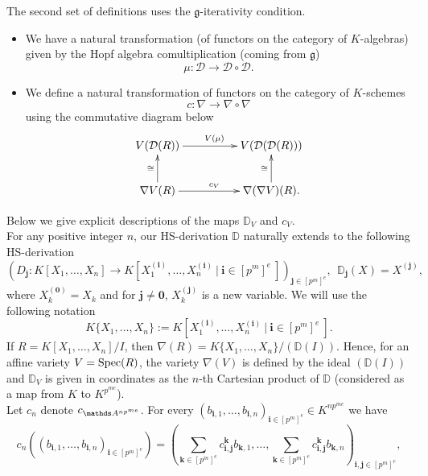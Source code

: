 \documentclass[10pt]{amsart}
\theoremstyle{definition}
\begin{document}
\noindent
The second set of definitions uses the $\mathfrak{g}$-iterativity condition.
\begin{itemize}

\item We have a natural transformation (of functors on the category of $K$-algebras) given by the Hopf algebra comultiplication (coming from $\mathfrak{g}$)
$$\mu:\mathcal{D}\to \mathcal{D}\circ \mathcal{D}.$$

\item We define a natural transformation of functors on the category of $K$-schemes
$$c:\nabla\to \nabla\circ \nabla$$
using the commutative diagram below
\begin{equation*}
\xymatrixcolsep{4pc}
\xymatrix{V(\mathcal{D}(R))  \ar[r]^{V(\mu)} &  V(\mathcal{D}(\mathcal{D}(R)))\\
  \nabla V(R) \ar[u]^{\cong} \ar[r]^{c_V} &  \nabla(\nabla V)(R) \ar[u]^{\cong}. }
\end{equation*}

\end{itemize}
\noindent
Below we give explicit descriptions of the maps $\mathbb{D}_V$ and $c_V$.
\\
For any positive integer $n$, our HS-derivation $\mathbb{D}$ naturally extends to the following HS-derivation
$$\left(D_{\mathbf{j}}:K[X_1,\ldots,X_n]\to K[X_1^{(\mathbf{i})},\ldots,X_n^{(\mathbf{i})}\ |\ \mathbf{i}\in[p^m]^e\ ]\right)_{\mathbf{j}\in[p^m]^e},\ \ \mathbb{D}_{\mathbf{j}}(X)=X^{(\mathbf{j})},$$
where $X_k^{(\mathbf{0})}=X_k$ and for $\mathbf{j}\neq \mathbf{0}$, $X_k^{(\mathbf{j})}$ is a new variable. We will use the following notation $$K\{X_1,\ldots,X_n\}:=K[X_1^{(\mathbf{i})},\ldots,X_n^{(\mathbf{i})}\ |\ \mathbf{i}\in[p^m]^e\ ].$$
If $R=K[X_1,\ldots,X_n]/I$, then $\nabla(R)=K\{X_1,\ldots,X_n\}/(\mathbb{D}(I))$. Hence, for an affine variety $V=\operatorname{Spec}(R)$, the variety $\nabla(V)$ is defined by the ideal $(\mathbb{D}(I))$ and $\mathbb{D}_V$ is given in coordinates as the $n$-th Cartesian product of $\mathbb{D}$ (considered as a map from $K$ to $K^{p^{me}}$).
\\
Let $c_n$ denote $c_{\Aa^{np^{me}}}$. For every $(b_{\mathbf{i},1},\ldots,b_{\mathbf{i},n})_{\mathbf{i}\in [p^m]^e}\in K^{np^{me}}$ we have
$$c_n\left((b_{\mathbf{i},1},\ldots,b_{\mathbf{i},n})_{\mathbf{i}\in [p^m]^e}\right)=
\left(\sum\limits_{\mathbf{k}\in[p^m]^e}c_{\mathbf{i},\mathbf{j}}^{\mathbf{k}}b_{\mathbf{k},1},\ldots,
\sum\limits_{\mathbf{k}\in[p^m]^e}c_{\mathbf{i},\mathbf{j}}^{\mathbf{k}}b_{\mathbf{k},n}\right)_{\mathbf{i},\mathbf{j}\in [p^m]^e},$$
\end{document}
